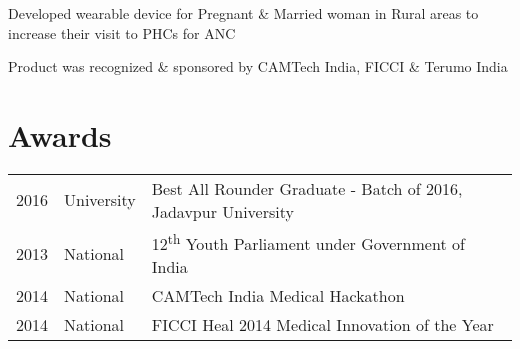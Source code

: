 \documentclass[]{deedy-resume-openfont}
\begin{document}
\begin{minipage}[t]{0.66\textwidth}
\begin{tightemize}
\item Developed wearable device for Pregnant \& Married woman in Rural areas to increase their visit to PHCs for ANC
\item Product was recognized \& sponsored by CAMTech India, FICCI \& Terumo India
\end{tightemize}
\sectionsep


\section{Awards} 
\begin{tabular}{rll}
2016	     & University  & Best All Rounder Graduate - Batch of 2016, Jadavpur University\\
2013     & National & 12\textsuperscript{th} Youth Parliament under Government of India  \\
2014	     & National  & CAMTech India Medical Hackathon\\
2014	     & National  & FICCI Heal 2014 Medical Innovation of the Year\\
\end{tabular}
\sectionsep

\end{minipage} 
\end{document}
